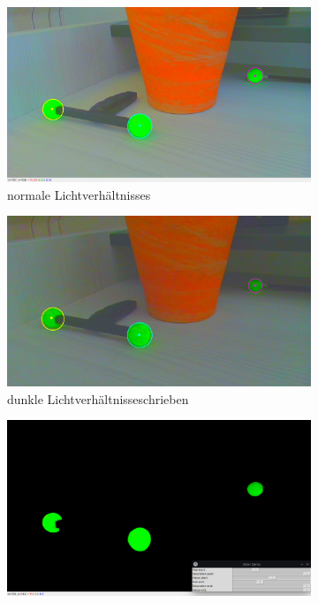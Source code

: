\documentclass[12pt, ngerman]{article}
\begin{document}
\begin{figure}[htbp!]
  \centering
  \begin{subfigure}[t]{0.45\textwidth}
      \centering
      \includegraphics[width=\textwidth]{2d-color.jpg}
      \caption{normale Lichtverhältnisses}
      \label{Abb: 2d-color-normal}
  \end{subfigure}
  \hfill
  \begin{subfigure}[t]{0.45\textwidth}
      \centering
      \includegraphics[width=\textwidth]{2d-color-dark.jpg}
      \caption{dunkle Lichtverhältnisseschrieben}
      \label{Abb: 2d-color-dunkel}
  \end{subfigure}
  \hfill
  \vspace{10pt}
  \begin{subfigure}[t]{0.6\textwidth}
      \centering
      \includegraphics[width=\textwidth]{2d-color-filter.jpg}

\end{subfigure}
\end{figure}
\end{document}
